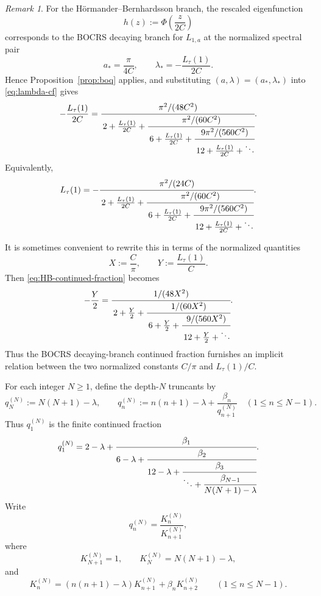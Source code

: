 \documentclass[11pt,letterpaper]{amsart}
\numberwithin{equation}{section}
\theoremstyle{plain}
\theoremstyle{remark}
\newtheorem{remark}[theorem]{Remark}
\begin{document}
\begin{remark}\label{rem:HB-cf-relation}
For the H\"ormander--Bernhardsson branch, the rescaled eigenfunction
\[
h(z):=\Phi\!\left(\frac{z}{2C}\right)
\]
corresponds to the BOCRS decaying branch for \(L_{1,a}\) at the normalized spectral pair
\[
a_*=\frac{\pi}{4C},
\qquad
\lambda_*=-\frac{L_\tau(1)}{2C}.
\]
Hence Proposition~\ref{prop:boq} applies, and substituting
\((a,\lambda)=(a_*,\lambda_*)\) into \eqref{eq:lambda-cf} gives
\begin{equation}\label{eq:HB-continued-fraction}
-\frac{L_\tau(1)}{2C}
=
\cfrac{\pi^2/(48C^2)}
{\,2+\frac{L_\tau(1)}{2C}
+\cfrac{\pi^2/(60C^2)}
{\,6+\frac{L_\tau(1)}{2C}
+\cfrac{9\pi^2/(560C^2)}
{\,12+\frac{L_\tau(1)}{2C}+\ddots}}}.
\end{equation}
Equivalently,
\begin{equation}\label{eq:HB-continued-fraction-Ltau}
L_\tau(1)
=
-\cfrac{\pi^2/(24C)}
{\,2+\frac{L_\tau(1)}{2C}
+\cfrac{\pi^2/(60C^2)}
{\,6+\frac{L_\tau(1)}{2C}
+\cfrac{9\pi^2/(560C^2)}
{\,12+\frac{L_\tau(1)}{2C}+\ddots}}}.
\end{equation}

It is sometimes convenient to rewrite this in terms of the normalized quantities
\[
X:=\frac{C}{\pi},
\qquad
Y:=\frac{L_\tau(1)}{C}.
\]
Then \eqref{eq:HB-continued-fraction} becomes
\[
-\frac{Y}{2}
=
\cfrac{1/(48X^2)}
{\,2+\frac{Y}{2}
+\cfrac{1/(60X^2)}
{\,6+\frac{Y}{2}
+\cfrac{9/(560X^2)}
{\,12+\frac{Y}{2}+\ddots}}}.
\]
Thus the BOCRS decaying-branch continued fraction furnishes an implicit relation between the
two normalized constants \(C/\pi\) and \(L_\tau(1)/C\). 
\end{remark}


For each integer $N\ge 1$, define the depth-$N$ truncants by
\begin{equation}\label{eq:q-truncants}
q_N^{(N)}:=N(N+1)-\lambda,
\qquad
q_n^{(N)}:=n(n+1)-\lambda+\frac{\beta_n}{q_{n+1}^{(N)}}
\quad(1\le n\le N-1).
\end{equation}
Thus $q_1^{(N)}$ is the finite continued fraction
\begin{equation}\label{eq:q1-truncant}
q_1^{(N)}
=
2-\lambda+
\cfrac{\beta_1}{6-\lambda+
\cfrac{\beta_2}{12-\lambda+
\cfrac{\beta_3}{\ddots+
\cfrac{\beta_{N-1}}{N(N+1)-\lambda}}}}.
\end{equation}
Write
\begin{equation}\label{eq:K-def}
q_n^{(N)}=\frac{K_n^{(N)}}{K_{n+1}^{(N)}},
\end{equation}
where
\begin{equation}\label{eq:K-recurrence}
K_{N+1}^{(N)}=1,
\qquad
K_N^{(N)}=N(N+1)-\lambda,
\end{equation}
and
\begin{equation}\label{eq:K-recursive}
K_n^{(N)}=(n(n+1)-\lambda)K_{n+1}^{(N)}+\beta_n K_{n+2}^{(N)}
\qquad(1\le n\le N-1).
\end{equation}
\end{document}
